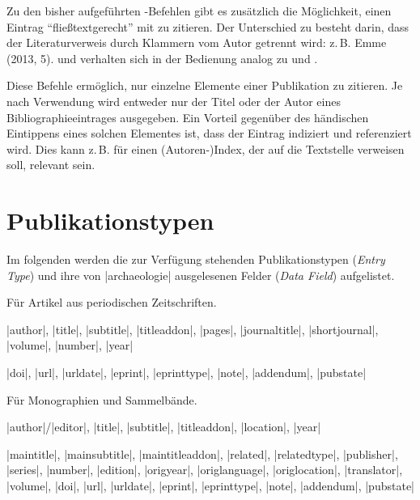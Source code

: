 \documentclass[a4paper,10pt,ngerman]{ltxdoc}
\begin{document}
\DescribeMacro{\textcite}  \DescribeMacro{\textcites}  Zu den bisher aufgeführten -Befehlen gibt es zusätzlich die Möglichkeit, einen Eintrag \enquote{fließtextgerecht} mit  zu zitieren. 
Der Unterschied zu  besteht darin, dass der Literaturverweis durch Klammern vom Autor getrennt wird: z.\,B. Emme (2013, 5).
 und  verhalten sich in der Bedienung analog zu  und .

\DescribeMacro{\citeauthor}  \DescribeMacro{\citetitle}  Diese Befehle ermöglich, nur einzelne Elemente einer Publikation zu zitieren. Je nach Verwendung wird entweder nur der Titel oder der Autor eines Bibliographieeintrages ausgegeben. Ein Vorteil gegenüber des händischen Eintippens eines solchen Elementes ist, dass der Eintrag indiziert und referenziert wird. Dies kann z.\,B. für einen (Autoren-)Index, der auf die Textstelle verweisen soll, relevant sein.
   

\section{Publikationstypen}
Im folgenden werden die zur Verfügung stehenden Publikationstypen (\emph{Entry Type}) und ihre von |archaeologie| ausgelesenen Felder (\emph{Data Field}) aufgelistet.

  Für Artikel aus periodischen Zeitschriften.
\begin{description}[topsep=0pt] 
\item[Notwendig:] |author|, |title|, |subtitle|,  |titleaddon|, |pages|, |journaltitle|, |shortjournal|, |volume|, |number|, |year|
\item[Optional:] |doi|, |url|, |urldate|, |eprint|, |eprinttype|, |note|, |addendum|, |pubstate|
\end{description}



    Für Monographien und Sammelbände.
\begin{description}[topsep=0pt]
\item[Notwendig:] |author|/|editor|, |title|, |subtitle|, |titleaddon|, |location|, |year|
\item[Optional:] |maintitle|, |mainsubtitle|, |maintitleaddon|, |related|, |relatedtype|, |publisher|, |series|, |number|, |edition|, |origyear|, |origlanguage|, |origlocation|, |translator|, |volume|, |doi|, |url|, |urldate|, |eprint|, |eprinttype|, |note|, |addendum|, |pubstate|
\end{description}
\end{document}
